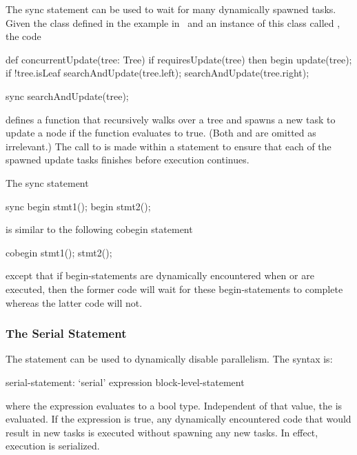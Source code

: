 \begin{example}
The sync statement can be used to wait for many dynamically spawned
tasks.  Given the  class defined in the example
in~ and an instance of this class
called , the code
\begin{chapel}
def concurrentUpdate(tree: Tree) {
  if requiresUpdate(tree) then
    begin update(tree);
  if !tree.isLeaf {
    searchAndUpdate(tree.left);
    searchAndUpdate(tree.right);
  }
}

sync searchAndUpdate(tree);
\end{chapel}
defines a function  that recursively walks over
a tree and spawns a new task to update a node if the
function  evaluates to true.
(Both  and  are omitted as
irrelevant.)  The call to  is made within
a  statement to ensure that each of the spawned update
tasks finishes before execution continues.
\end{example}

\begin{example}
The sync statement
\begin{chapel}
sync {
  begin stmt1();
  begin stmt2();
}
\end{chapel}
is similar to the following cobegin statement
\begin{chapel}
cobegin {
  stmt1();
  stmt2();
}
\end{chapel}
except that if begin-statements are dynamically encountered
when  or  are executed, then the former
code will wait for these begin-statements to complete whereas the
latter code will not.
\end{example}

\subsubsection{The Serial Statement}
\label{Serial}

The  statement can be used to dynamically disable
parallelism.  The syntax is:
\begin{syntax}
serial-statement:
  `serial' expression block-level-statement
\end{syntax}
where the expression evaluates to a bool type.  Independent of that
value, the  is evaluated. If the
expression is true, any dynamically encountered code that would result
in new tasks is executed without spawning any new tasks.  In effect,
execution is serialized.

